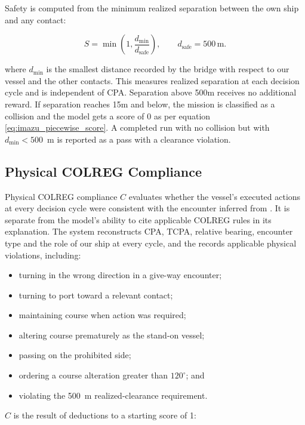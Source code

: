 \documentclass[10pt]{reportMaster}
\begin{document}
Safety is computed from the minimum realized separation between the own ship
and any contact:

\begin{equation}
S =
\min\left(1,\frac{d_{\min}}{d_{\mathrm{safe}}}\right),
\qquad
d_{\mathrm{safe}} = 500\,\mathrm{m}.
\label{eq:safety_axis}
\end{equation}

where $d_{\min}$ is the smallest distance recorded by the bridge with respect to our vessel and the other contacts. This measures realized separation at each decision cycle and is independent of CPA. Separation above 500m receives no additional reward. If separation reaches 15m and below, the mission is classified as a collision and the model gets a score of 0 as per equation \ref{eq:imazu_piecewise_score}. A completed run with no collision but with $d_{\min}<500$~m is reported as a pass with a clearance violation. 

\subsection{Physical COLREG Compliance}

Physical COLREG compliance $C$ evaluates whether the vessel's executed actions at every decision cycle were consistent with the encounter inferred from \cite{10.3389/frobt.2020.00011}. It is separate from the model's ability to cite applicable COLREG rules in its explanation. The system reconstructs CPA, TCPA, relative bearing, encounter type and the role of our ship at every cycle, and the records applicable physical violations, including: 

\begin{itemize}
    \item turning in the wrong direction in a give-way encounter;
    \item turning to port toward a relevant contact;
    \item maintaining course when action was required;
    \item altering course prematurely as the stand-on vessel;
    \item passing on the prohibited side;
    \item ordering a course alteration greater than $120^\circ$; and
    \item violating the 500~m realized-clearance requirement.
\end{itemize}

$C$ is the result of deductions to a starting score of 1:
\end{document}
